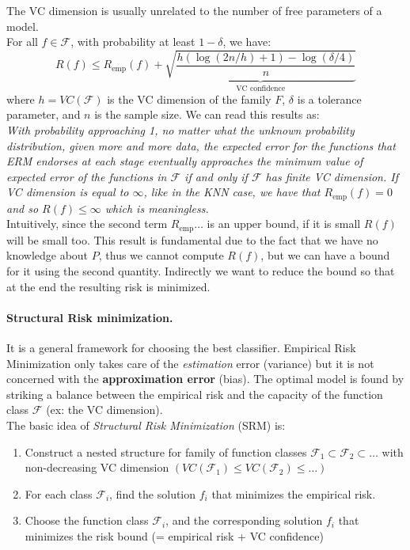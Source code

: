 The VC dimension is usually unrelated to the number of free parameters of a model.\\
For all $f \in \mathcal{ F }$, with probability at least $1-\delta$, we have:
$$
R ( f ) \leq R _ { \mathrm { emp } } ( f ) + \underbrace{\sqrt { \frac { h ( \log ( 2 n / h ) + 1 ) - \log ( \delta / 4 ) } { n } }}_{\text{VC confidence}}
$$
where $h=VC(\mathcal{ F })$ is the VC dimension of the family $F$, $\delta$ is a tolerance parameter, and $n$ is the sample size. We can read this results as:\\

\textit{With probability approaching  1, no matter what the unknown probability distribution, given more and more data, the expected error for the functions that ERM endorses at each stage eventually approaches the minimum value of expected error of the functions in $\mathcal{ F }$ if and only if $\mathcal{ F }$ has finite VC dimension. If VC dimension is equal to $\infty$, like in the KNN case, we have that $R_\text{emp}(f) = 0$ and so $R(f) \leq \infty$ which is meaningless.}\\

Intuitively, since the second term $R_\text{emp}\dots$ is an upper bound, if it is small $R(f)$ will be small too. This result is fundamental due to the fact that we have no knowledge about $P$, thus we cannot compute $R(f)$, but we can have a bound for it using the second quantity. Indirectly we want to reduce the bound so that at the end the resulting risk is minimized.

\paragraph*{Structural Risk minimization.} It is a general framework for choosing the best classifier. Empirical Risk Minimization only takes care of the \textit{estimation} error (variance) but it is not concerned with the \textbf{approximation error} (bias). The optimal model is found by striking a balance between the empirical risk and the capacity of the function class $\mathcal{ F }$ (ex: the VC dimension).\\
The basic idea of \textit{Structural Risk Minimization} (SRM) is:
\begin{enumerate}
	\item Construct a nested structure for family of function classes $\mathcal{ F }_1 \subset \mathcal{ F }_2 \subset \dots$ with non-decreasing VC dimension $(VC(\mathcal{ F }_1) \leq VC(\mathcal{ F }_2) \leq \dots)$
	\item For each class $\mathcal{ F }_i$, find the solution $f_i$ that minimizes the empirical risk.
	\item Choose the function class $\mathcal{ F }_i$, and the corresponding solution $f_i$ that minimizes the risk bound (= empirical risk + VC confidence) 
\end{enumerate}

